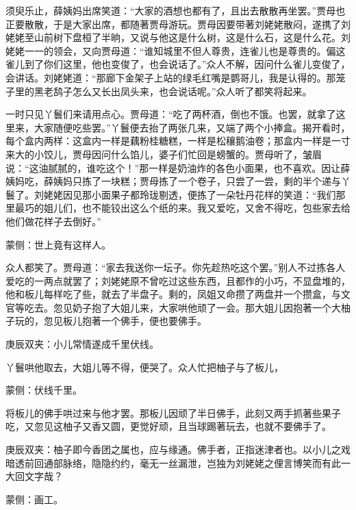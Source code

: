 \begin{parag}
    须臾乐止，薛姨妈出席笑道：“大家的酒想也都有了，且出去散散再坐罢。”贾母也正要散散，于是大家出席，都随著贾母游玩。贾母因要带著刘姥姥散闷，遂携了刘姥姥至山前树下盘桓了半晌，又说与他这是什么树，这是什么石，这是什么花。刘姥姥一一的领会，又向贾母道：“谁知城里不但人尊贵，连雀儿也是尊贵的。偏这雀儿到了你们这里，他也变俊了，也会说话了。”众人不解，因问什么雀儿变俊了，会讲话。刘姥姥道：“那廊下金架子上站的绿毛红嘴是鹦哥儿，我是认得的。那笼子里的黑老鸹子怎么又长出凤头来，也会说话呢。”众人听了都笑将起来。
\end{parag}


\begin{parag}
    一时只见丫鬟们来请用点心。贾母道：“吃了两杯酒，倒也不饿。也罢，就拿了这里来，大家随便吃些罢。”丫鬟便去抬了两张几来，又端了两个小捧盒。揭开看时，每个盒内两样：这盒内一样是藕粉桂糖糕，一样是松穰鹅油卷；那盒内一样是一寸来大的小饺儿，贾母因问什么馅儿，婆子们忙回是螃蟹的。贾母听了，皱眉说：“这油腻腻的，谁吃这个！”那一样是奶油炸的各色小面果，也不喜欢。因让薛姨妈吃，薛姨妈只拣了一块糕；贾母拣了一个卷子，只尝了一尝，剩的半个递与丫鬟了。刘姥姥因见那小面果子都玲珑剔透，便拣了一朵牡丹花样的笑道：“我们那里最巧的姐儿们，也不能铰出这么个纸的来。我又爱吃，又舍不得吃，包些家去给他们做花样子去倒好。”\begin{note}蒙侧：世上竟有这样人。\end{note}众人都笑了。贾母道：“家去我送你一坛子。你先趁热吃这个罢。”别人不过拣各人爱吃的一两点就罢了；刘姥姥原不曾吃过这些东西，且都作的小巧，不显盘堆的，他和板儿每样吃了些，就去了半盘子。剩的，凤姐又命攒了两盘并一个攒盒，与文官等吃去。忽见奶子抱了大姐儿来，大家哄他顽了一会。那大姐儿因抱著一个大柚子玩的，忽见板儿抱著一个佛手，便也要佛手。\begin{note}庚辰双夹：小儿常情遂成千里伏线。\end{note}丫鬟哄他取去，大姐儿等不得，便哭了。众人忙把柚子与了板儿，\begin{note}蒙侧：伏线千里。\end{note}将板儿的佛手哄过来与他才罢。那板儿因顽了半日佛手，此刻又两手抓著些果子吃，又忽见这柚子又香又圆，更觉好顽，且当球踢著玩去，也就不要佛手了。\begin{note}庚辰双夹：柚子即今香团之属也，应与缘通。佛手者，正指迷津者也。以小儿之戏暗透前回通部脉络，隐隐约约，毫无一丝漏泄，岂独为刘姥姥之俚言博笑而有此一大回文字哉？\end{note}\begin{note}蒙侧：画工。\end{note}
\end{parag}


